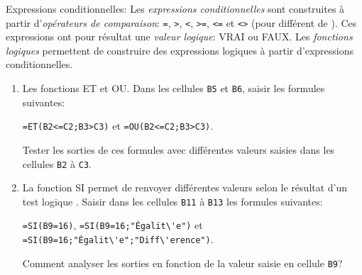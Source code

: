\documentclass[a4paper, 9pt]{article}
\newcommand*{\sff}[1] {{\sffamily#1}}
\begin{document}
 \exost Expressions conditionnelles:
  Les \emph{expressions conditionnelles} sont construites à partir d'\emph{op\'erateurs de comparaison}: \verb+=+, \verb+>+, \verb+<+, \verb+>=+, \verb+<=+ et \verb+<>+ (pour \og diff\'erent de \fg). Ces expressions ont pour r\'esultat une \emph{valeur logique}: \sff{VRAI} ou \sff{FAUX}. Les \emph{fonctions logiques} permettent de construire des expressions logiques à partir d'expressions conditionnelles.
  \begin{enumerate}
    \item Les fonctions \sff{ET} et \sff{OU}. Dans les cellules \verb+B5+ et \verb+B6+, saisir les formules suivantes:
    \begin{center}
      \verb+=ET(B2<=C2;B3>C3)+ \quad et \quad \verb+=OU(B2<=C2;B3>C3)+.
    \end{center}
    Tester les sorties de ces formules avec diff\'erentes valeurs saisies dans les cellules \verb+B2+ à \verb+C3+.
    \item La fonction \sff{SI} permet de renvoyer diff\'erentes valeurs selon le r\'esultat d'un \og test logique \fg. Saisir dans les cellules \verb+B11+ à \verb+B13+ les formules suivantes:
    \begin{center}
      \verb+=SI(B9=16)+, \quad \verb+=SI(B9=16;"Égalit\'e")+ \quad et \quad \verb+=SI(B9=16;"Égalit\'e";"Diff\'erence")+.
    \end{center}
    Comment analyser les sorties en fonction de la valeur saisie en cellule \verb+B9+?
  \end{enumerate}
\end{document}
